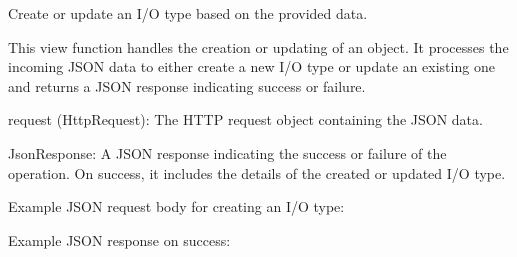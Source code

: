 \documentclass[letterpaper,10pt,english]{sphinxmanual}
\begin{document}
\begin{fulllineitems}
\label{\detokenize{app:app.views.update_io}}
\pysigstartsignatures
{}
\pysigstopsignatures
\sphinxAtStartPar
Create or update an I/O type based on the provided data.

\sphinxAtStartPar
This view function handles the creation or updating of an  object. 
It processes the incoming JSON data to either create a new I/O type or update an existing one 
and returns a JSON response indicating success or failure.
\begin{description}
\sphinxAtStartPar
request (HttpRequest): The HTTP request object containing the JSON data.

\sphinxAtStartPar
JsonResponse: A JSON response indicating the success or failure of the operation. 
On success, it includes the details of the created or updated I/O type.

\sphinxAtStartPar
Example JSON request body for creating an I/O type:

\begin{sphinxVerbatim}[commandchars=\\\{\}]
\end{sphinxVerbatim}

\sphinxAtStartPar
Example JSON response on success:

\begin{sphinxVerbatim}[commandchars=\\\{\}]
\end{sphinxVerbatim}


\end{description}
\end{fulllineitems}
\end{document}
